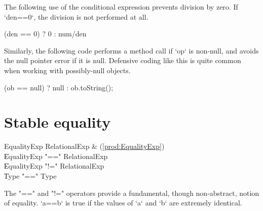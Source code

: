 \begin{ex}
The following use of the conditional expression prevents division by zero.  If
\xcd`den==0`, the division is not performed at all.
\begin{xten}
(den == 0) ? 0 : num/den
\end{xten}

Similarly, the following code performs a method call if \xcd`op` is non-null,
and avoids the null pointer error if it is null.  Defensive coding like this
is quite common when working with possibly-null objects.
\begin{xten}
(ob == null) ? null : ob.toString();
\end{xten}



\end{ex}

\section{Stable equality}
\label{StableEquality}
\index{\Xcd{==}}

\begin{bbgrammar}
 EqualityExp    \: RelationalExp & (\ref{prod:EqualityExp})\\%
    \| EqualityExp \xcd"==" RelationalExp\\
    \| EqualityExp \xcd"!=" RelationalExp\\
    \| Type  \xcd"==" Type \\
\end{bbgrammar}


The \xcd"==" and \xcd"!=" operators provide a fundamental, though
non-abstract, notion of equality.  \xcd`a==b` is true if the values of \xcd`a`
and \xcd`b` are extremely identical.

